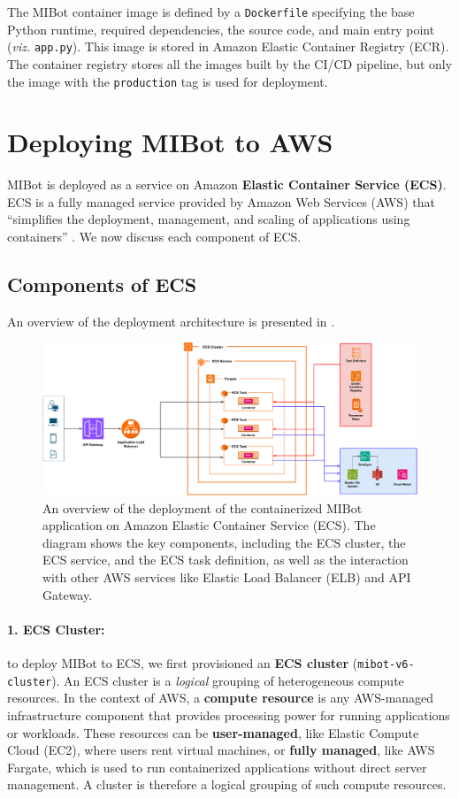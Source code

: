 The MIBot container image is defined by a \texttt{Dockerfile} specifying the base Python runtime, required dependencies, the source code, and main entry point (\emph{viz.} \texttt{app.py}). This image is stored in Amazon Elastic Container Registry (ECR). The container registry stores all the images built by the CI/CD pipeline, but only the image with the \texttt{production} tag is used for deployment.

\section{Deploying MIBot to AWS}
\label{sec:mibot-deployment}

MIBot is deployed as a service on Amazon \textbf{Elastic Container Service (ECS)}. ECS is a fully managed service provided by Amazon Web Services (AWS) that ``simplifies the deployment, management, and scaling of applications using containers'' \citep{aws-ecs-getting-started}. We now discuss each component of ECS.

\subsection{Components of ECS}
An overview of the deployment architecture is presented in .
\begin{figure}[ht]
  \centering
  \includegraphics[width=0.99\linewidth]{fig/deployment.drawio.pdf} 
  \caption[MIBot Deployment on AWS ECS]{An overview of the deployment of the containerized MIBot application on Amazon Elastic Container Service (ECS). The diagram shows the key components, including the ECS cluster, the ECS service, and the ECS task definition, as well as the interaction with other AWS services like Elastic Load Balancer (ELB) and API Gateway.}
  \label{fig:ecs-components}
\end{figure}

\paragraph{1. ECS Cluster:} to deploy MIBot to ECS, we first provisioned an \textbf{ECS cluster} (\texttt{mibot-v6-cluster}). An ECS cluster is a \textit{logical} grouping of heterogeneous compute resources. In the context of AWS, a \textbf{compute resource} is any AWS-managed infrastructure component that provides processing power for running applications or workloads. These resources can be \textbf{user-managed}, like Elastic Compute Cloud (EC2), where users rent virtual machines, or \textbf{fully managed}, like AWS Fargate, which is used to run containerized applications without direct server management. A cluster is therefore a logical grouping of such compute resources.

